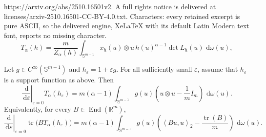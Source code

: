 \documentclass[10pt,a4paper]{amsart}
\DeclareMathOperator{\End}{End}
\DeclareMathOperator{\tr}{tr}
\newcommand{\Id}{I}
\newcommand{\R}{\mathbb{R}}
\newcommand{\dd}{\,\mathrm{d}}
\newcommand{\ip}[2]{\left\langle #1,#2\right\rangle_2}
\newcommand{\sphere}{\mathbb{S}}
\begin{document}
https://arxiv.org/abs/2510.16501v2. A full rights notice is delivered at licenses/arxiv-2510.16501-CC-BY-4.0.txt. Characters: every retained excerpt is pure ASCII, so the delivered engine, XeLaTeX with its default Latin Modern text font, reports no missing character.
\begin{equation}\label{eq:T-alpha}
T_\alpha(h)
=\frac{m}{Z_\alpha(h)}
\int_{\sphere^{m-1}}x_h(u)\otimes u\,
 h(u)^{\alpha-1}\det L_h(u)\,\dd\omega(u),
\end{equation}

\begin{theorem}\label{thm:first-variation}
Let $g\in C^\infty(\sphere^{m-1})$ and $h_\varepsilon=1+\varepsilon g$. For all sufficiently small $\varepsilon$, assume that $h_\varepsilon$ is a support function as above. Then
\begin{equation}\label{eq:first-variation-operator}
\left.\frac{\dd}{\dd\varepsilon}\right|_{\varepsilon=0}T_\alpha(h_\varepsilon)
=m(\alpha-1)\int_{\sphere^{m-1}}g(u)
\left(u\otimes u-\frac1m\Id_m\right)\,\dd\omega(u).
\end{equation}
Equivalently, for every $B\in\End(\R^m)$,
\begin{equation}\label{eq:first-variation-paired}
\left.\frac{\dd}{\dd\varepsilon}\right|_{\varepsilon=0}
\tr\big(BT_\alpha(h_\varepsilon)\big)
=m(\alpha-1)\int_{\sphere^{m-1}}g(u)
\left(\ip{Bu}{u}-\frac{\tr(B)}m\right)\,\dd\omega(u).
\end{equation}
\end{theorem}
\end{document}
